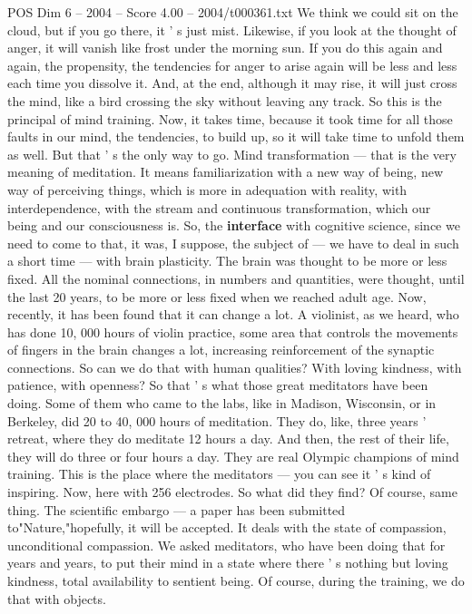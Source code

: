 \begin{textsample}{POS Dim 6 – 2004 – Score 4.00 – 2004/t000361.txt}
We think we could sit on the cloud, but if you go there, it ' s just mist.
Likewise, if you look at the thought of anger, it will vanish like frost under the morning sun.
If you do this again and again, the propensity, the tendencies for anger to arise again will be less and less each time you dissolve it.
And, at the end, although it may rise, it will just cross the mind, like a bird crossing the sky without leaving any track.
So this is the principal of mind training.
Now, it takes time, because it took time for all those faults in our mind, the tendencies, to build up, so it will take time to unfold them as well.
But that ' s the only way to go.
Mind transformation — that is the very meaning of meditation.
It means familiarization with a new way of being, new way of perceiving things, which is more in adequation with reality, with interdependence, with the stream and continuous transformation, which our being and our consciousness is.
So, the \textbf{interface} with cognitive science, since we need to come to that, it was, I suppose, the subject of — we have to deal in such a short time — with brain plasticity.
The brain was thought to be more or less fixed.
All the nominal connections, in numbers and quantities, were thought, until the last 20 years, to be more or less fixed when we reached adult age.
Now, recently, it has been found that it can change a lot.
A violinist, as we heard, who has done 10, 000 hours of violin practice, some area that controls the movements of fingers in the brain changes a lot, increasing reinforcement of the synaptic connections.
So can we do that with human qualities?
With loving kindness, with patience, with openness?
So that ' s what those great meditators have been doing.
Some of them who came to the labs, like in Madison, Wisconsin, or in Berkeley, did 20 to 40, 000 hours of meditation.
They do, like, three years ' retreat, where they do meditate 12 hours a day.
And then, the rest of their life, they will do three or four hours a day.
They are real Olympic champions of mind training.
This is the place where the meditators — you can see it ' s kind of inspiring.
Now, here with 256 electrodes.
So what did they find?
Of course, same thing.
The scientific embargo — a paper has been submitted to"Nature,"hopefully, it will be accepted.
It deals with the state of compassion, unconditional compassion.
We asked meditators, who have been doing that for years and years, to put their mind in a state where there ' s nothing but loving kindness, total availability to sentient being.
Of course, during the training, we do that with objects.

\end{textsample}
